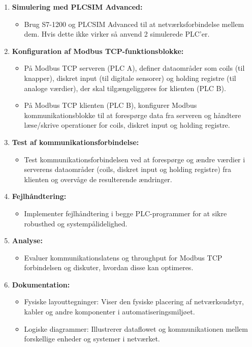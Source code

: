 \begin{enumerate}
	\item \textbf{Simulering med PLCSIM Advanced:}
	\begin{itemize}
		\item Brug S7-1200 og PLCSIM Advanced til at netværksforbindelse mellem dem. Hvis dette ikke virker så anvend 2 simulerede PLC'er.
	\end{itemize}
	\item \textbf{Konfiguration af Modbus TCP-funktionsblokke:}
	\begin{itemize}
		\item På Modbus TCP serveren (PLC A), definer dataområder som coils (til knapper), diskret input (til digitale sensorer) og holding registre (til analoge værdier), der skal tilgængeliggøres for klienten (PLC B).
		\item På Modbus TCP klienten (PLC B), konfigurer Modbus kommunikationsblokke til at forespørge data fra serveren og håndtere læse/skrive operationer for coils, diskret input og holding registre.
	\end{itemize}
	\item \textbf{Test af kommunikationsforbindelse:}
	\begin{itemize}
		\item Test kommunikationsforbindelsen ved at forespørge og ændre værdier i serverens dataområder (coils, diskret input og holding registre) fra klienten og overvåge de resulterende ændringer.
	\end{itemize}
	\item \textbf{Fejlhåndtering:}
	\begin{itemize}
		\item Implementer fejlhåndtering i begge PLC-programmer for at sikre robusthed og systempålidelighed.
	\end{itemize}
	\item \textbf{Analyse:}
	\begin{itemize}
		\item Evaluer kommunikationslatens og throughput for Modbus TCP forbindelsen og diskuter, hvordan disse kan optimeres.
	\end{itemize}
	\item \textbf{Dokumentation:}
	\begin{itemize}
		\item Fysiske layouttegninger: Viser den fysiske placering af netværksudstyr, kabler og andre komponenter i automatiseringsmiljøet.
		\item Logiske diagrammer: Illustrerer dataflowet og kommunikationen mellem forskellige enheder og systemer i netværket.

\end{itemize}
\end{enumerate}
